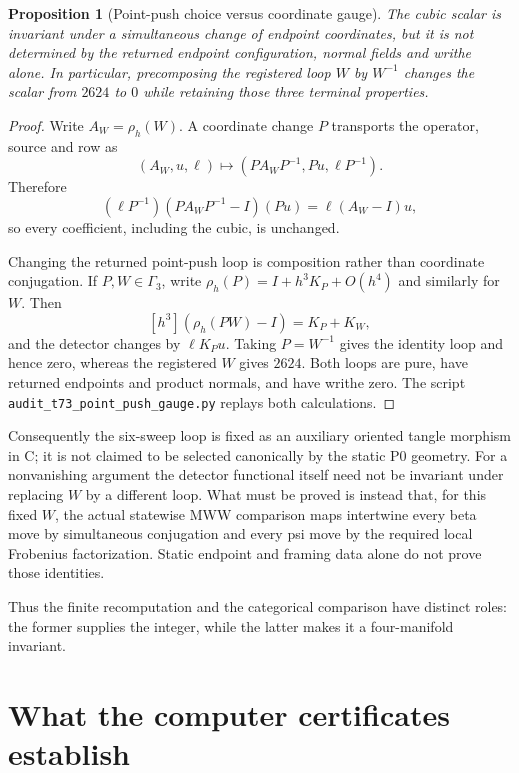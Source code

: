 \documentclass[11pt]{amsart}
\newtheorem{proposition}[theorem]{Proposition}
\theoremstyle{definition}
\theoremstyle{remark}
\begin{document}
\begin{proposition}[Point-push choice versus coordinate gauge]
\label{prop:point-push-gauge}
The cubic scalar is invariant under a simultaneous change of endpoint
coordinates, but it is not determined by the returned endpoint configuration,
normal fields and writhe alone.  In particular, precomposing the registered
loop $W$ by $W^{-1}$ changes the scalar from $2624$ to $0$ while retaining
those three terminal properties.
\end{proposition}

\begin{proof}
Write $A_W=\rho_h(W)$.  A coordinate change $P$ transports the operator,
source and row as
\[
(A_W,u,\ell)\longmapsto
(PA_WP^{-1},Pu,\ell P^{-1}).
\]
Therefore
\[
(\ell P^{-1})(PA_WP^{-1}-I)(Pu)=\ell(A_W-I)u,
\]
so every coefficient, including the cubic, is unchanged.

Changing the returned point-push loop is composition rather than coordinate
conjugation.  If $P,W\in\Gamma_3$, write
$\rho_h(P)=I+h^3K_P+O(h^4)$ and similarly for $W$.  Then
\[
[h^3](\rho_h(PW)-I)=K_P+K_W,
\]
and the detector changes by $\ell K_Pu$.  Taking $P=W^{-1}$ gives the identity
loop and hence zero, whereas the registered $W$ gives $2624$.  Both loops are
pure, have returned endpoints and product normals, and have writhe zero.  The
script \texttt{audit\_t73\_point\_push\_gauge.py} replays both calculations.
\end{proof}

Consequently the six-sweep loop is fixed as an auxiliary oriented tangle
morphism in C; it is not claimed to be selected canonically by the static P0
geometry.  For a nonvanishing argument the detector functional itself need
not be invariant under replacing $W$ by a different loop.  What must be proved
is instead that, for this fixed $W$, the actual statewise MWW comparison maps
intertwine every beta move by simultaneous conjugation and every psi move by
the required local Frobenius factorization.  Static endpoint and framing data
alone do not prove those identities.

Thus the finite recomputation and the categorical comparison have distinct
roles: the former supplies the integer, while the latter makes it a
four-manifold invariant.



\section{What the computer certificates establish}\label{sec:certificate-scope}
\end{document}

